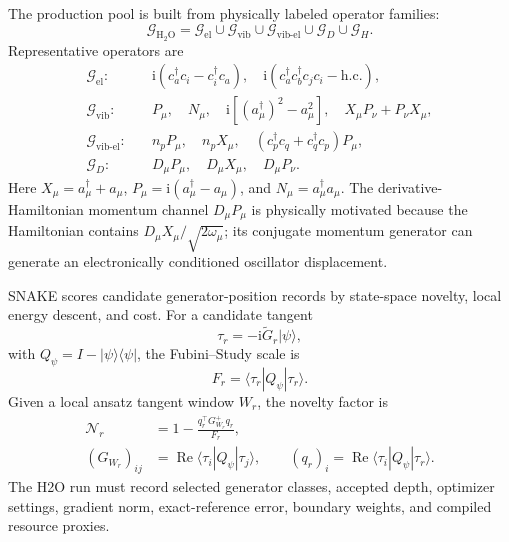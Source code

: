 \documentclass[
  reprint,
  amsmath,
  amssymb,
  aps,
  pra,
  nofootinbib,
  superscriptaddress,
  floatfix
]{revtex4-2}
\newcommand{\ii}{\mathrm{i}}
\newcommand{\Reop}{\operatorname{Re}}
\newcommand{\ket}[1]{|#1\rangle}
\newcommand{\bra}[1]{\langle #1|}
\newcommand{\Gcal}{\mathcal{G}}
\newcommand{\el}{\mathrm{el}}
\newcommand{\vib}{\mathrm{vib}}
\newcommand{\vibel}{\mathrm{vib}\text{-}\mathrm{el}}
\newcommand{\HtwoO}{\mathrm{H_2O}}
\begin{document}
The production pool is built from physically labeled operator families:
\begin{equation}
\Gcal_{\HtwoO}
=
\Gcal_{\el}
\cup
\Gcal_{\vib}
\cup
\Gcal_{\vibel}
\cup
\Gcal_{D}
\cup
\Gcal_{H}.
\label{eq:pool_union}
\end{equation}
Representative operators are
\begin{align}
\Gcal_{\el}:&\quad
\ii(c_a^\dagger c_i-c_i^\dagger c_a),
\quad
\ii(c_a^\dagger c_b^\dagger c_jc_i-\mathrm{h.c.}),
\nonumber\\
\Gcal_{\vib}:&\quad
P_\mu,\quad
N_\mu,\quad
\ii[(a_\mu^\dagger)^2-a_\mu^2],
\quad
X_\mu P_\nu+P_\nu X_\mu,
\nonumber\\
\Gcal_{\vibel}:&\quad
n_pP_\mu,\quad
n_pX_\mu,\quad
(c_p^\dagger c_q+c_q^\dagger c_p)P_\mu,
\nonumber\\
\Gcal_{D}:&\quad
D_\mu P_\mu,\quad
D_\mu X_\mu,\quad
D_\mu P_\nu .
\label{eq:pool_examples}
\end{align}
Here \(X_\mu=a_\mu^\dagger+a_\mu\), \(P_\mu=\ii(a_\mu^\dagger-a_\mu)\), and \(N_\mu=a_\mu^\dagger a_\mu\).  The derivative-Hamiltonian momentum channel \(D_\mu P_\mu\) is physically motivated because the Hamiltonian contains \(D_\mu X_\mu/\sqrt{2\omega_\mu}\); its conjugate momentum generator can generate an electronically conditioned oscillator displacement.

SNAKE scores candidate generator-position records by state-space novelty, local energy descent, and cost.  For a candidate tangent
\begin{equation}
\tau_r
=
-\ii \widetilde G_r\ket{\psi},
\label{eq:candidate_tangent}
\end{equation}
with \(Q_\psi=I-\ket{\psi}\bra{\psi}\), the Fubini--Study scale is
\begin{equation}
F_r
=
\bra{\tau_r}Q_\psi\ket{\tau_r}.
\label{eq:fubini_scale}
\end{equation}
Given a local ansatz tangent window \(W_r\), the novelty factor is
\begin{align}
\mathcal N_r
&=
1-
\frac{q_r^\top G_{W_r}^{+}q_r}{F_r},
\nonumber\\
(G_{W_r})_{ij}
&=
\Reop\bra{\tau_i}Q_\psi\ket{\tau_j},
\qquad
(q_r)_i
=
\Reop\bra{\tau_i}Q_\psi\ket{\tau_r}.
\label{eq:static_novelty}
\end{align}
The H2O run must record selected generator classes, accepted depth, optimizer settings, gradient norm, exact-reference error, boundary weights, and compiled resource proxies.
\end{document}
